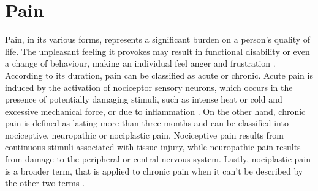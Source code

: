 \section{Pain}

Pain, in its various forms, represents a significant burden on a person's quality of life. The unpleasant feeling it provokes may result in functional disability or even a change of behaviour, making an individual feel anger and frustration \cite{Dirk2021}. According to its duration, pain can be classified as acute or chronic. Acute pain is induced by the activation of nociceptor sensory neurons, which occurs in the presence of potentially damaging stimuli, such as intense heat or cold and excessive mechanical force, or due to inflammation \cite{Jayakar2021}. On the other hand, chronic pain is defined as lasting more than three months \cite{Raman2022} and can be classified into nociceptive, neuropathic or nociplastic pain. Nociceptive pain results from continuous stimuli associated with tissue injury, while neuropathic pain results from damage to the peripheral or central nervous system. Lastly, nociplastic pain is a broader term, that is applied to chronic pain when it can't be described by the other two terms \cite{Fitzcharles2021}.